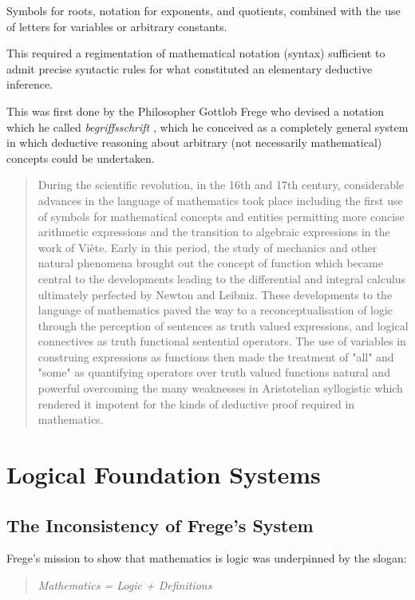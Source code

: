 \documentclass[10pt,titlepage]{book}
\begin{document}
Symbols for roots, notation for exponents, and quotients, combined with the use of letters for variables or arbitrary constants. 


This required a regimentation of mathematical notation (syntax) sufficient to admit precise syntactic rules for what constituted an elementary deductive inference.

This was first done by the Philosopher Gottlob Frege who devised a notation which he called \emph{begriffsschrift} \cite{frege79}, which he conceived as a completely general system in which deductive reasoning about arbitrary (not necessarily mathematical) concepts could be undertaken.

\begin{quote}
  During the scientific revolution, in the 16th and 17th century, considerable advances in the language of mathematics took place including the first use of symbols for mathematical concepts and entities permitting more concise arithmetic expressions and the transition to algebraic expressions in the work of Viète.
  Early in this period, the study of mechanics and other natural phenomena brought out the concept of function which became central to the developments leading to the differential and integral calculus ultimately perfected by Newton and Leibniz.
  These developments to the language of mathematics paved the way to a reconceptualisation of logic through the perception of sentences as truth valued expressions, and logical connectives as truth functional sentential operators.
  The use of variables in construing expressions as functions then made the treatment of "all" and "some" as quantifying operators over truth valued functions natural and powerful overcoming the many weaknesses in Aristotelian syllogistic which rendered it impotent for the kinds of deductive proof required in mathematics.
\end{quote}

\chapter{Logical Foundation Systems}\label{ChapLFS}

\section{The Inconsistency of Frege's System}

Frege's mission to show that mathematics is logic was underpinned by the slogan:

\begin{quote}
{\it Mathematics = Logic + Definitions}
\end{quote}
\end{document}

